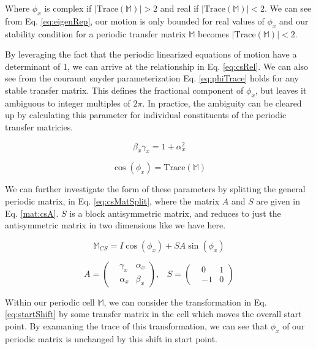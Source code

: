 Where $\phi_x$ is complex if $|\mathrm{Trace}(\mathbb{M})| > 2$ and real if $|\mathrm{Trace}(\mathbb{M})| < 2$. We can see from Eq. \ref{eq:eigenRep}, our motion is only bounded for real values of $\phi_x$ and our stability condition for a periodic transfer matrix $\mathbb{M}$ becomes $|\mathrm{Trace}(\mathbb{M})| < 2$.

By leveraging the fact that the periodic linearized equations of motion have a determinant of 1, we can arrive at the relationship in Eq. \ref{eq:csRel}. We can also see from the couraunt snyder parameterization Eq. \ref{eq:phiTrace} holds for any stable transfer matrix. This defines the fractional component of $\phi_x$, but leaves it ambiguous to integer multiples of $2\pi$. In practice, the ambiguity can be cleared up by calculating this parameter for individual constituents of the periodic transfer matricies.

\begin{equation} \label{eq:csRel}
	\beta_x \gamma_x  = 1 + \alpha_x^2
\end{equation}

\begin{equation} \label{eq:phiTrace}
	\cos{\left(\phi_x\right)} = \mathrm{Trace}(\mathbb{M})
\end{equation}

We can further investigate the form of these parameters by splitting the general periodic matrix, in Eq. \ref{eq:csMatSplit}, where the matrix $A$ and $S$ are given in Eq. \ref{mat:csA}. $S$ is a block antisymmetric matrix, and reduces to just the antisymmetric matrix in two dimensions like we have here.

\begin{equation} \label{eq:csMatSplit}
	\mathbb{M}_{CS} = I \cos{\left(\phi_x\right)} + S A \sin{\left(\phi_x\right)}
\end{equation}

\begin{equation} \label{mat:csA}
	A = 
\begin{pmatrix}
	&\gamma_x &\alpha_x\\
	&\alpha_x &\beta_x
\end{pmatrix},
\hspace{10pt} S =
\begin{pmatrix}
	&0 &1\\
	&-1 &0
\end{pmatrix}
\end{equation}

Within our periodic cell $\mathbb{M}$, we can consider the transformation in Eq. \ref{eq:startShift} by some transfer matrix in the cell which moves the overall start point. By examaning the trace of this transformation, we can see that $\phi_x$ of our periodic matrix is unchanged by this shift in start point.

